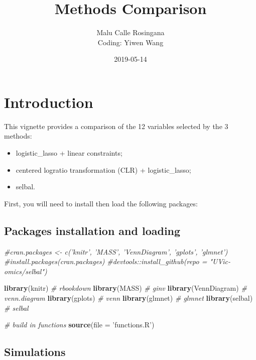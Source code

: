 \documentclass[]{book}
\title{Methods Comparison}
\author{Malu Calle Rosingana\\
Coding: Yiwen Wang}
\date{2019-05-14}
\newenvironment{Shaded}{\begin{snugshade}}{\end{snugshade}}
\newcommand{\KeywordTok}[1]{\textcolor[rgb]{0.13,0.29,0.53}{\textbf{#1}}}
\newcommand{\DataTypeTok}[1]{\textcolor[rgb]{0.13,0.29,0.53}{#1}}
\newcommand{\StringTok}[1]{\textcolor[rgb]{0.31,0.60,0.02}{#1}}
\newcommand{\CommentTok}[1]{\textcolor[rgb]{0.56,0.35,0.01}{\textit{#1}}}
\newcommand{\NormalTok}[1]{#1}
\providecommand{\tightlist}{%
  \setlength{\itemsep}{0pt}\setlength{\parskip}{0pt}}
\begin{document}
\maketitle

{
\setcounter{tocdepth}{3}
\tableofcontents
}
\chapter{Introduction}\label{introduction}

This vignette provides a comparison of the 12 variables selected by the
3 methods:

\begin{itemize}
\tightlist
\item
  logistic\_lasso + linear constraints;
\item
  centered logratio transformation (CLR) + logistic\_lasso;
\item
  selbal.
\end{itemize}

First, you will need to install then load the following packages:

\section{Packages installation and
loading}\label{packages-installation-and-loading}

\begin{Shaded}
\begin{Highlighting}[]
\CommentTok{#cran.packages <- c('knitr', 'MASS', 'VennDiagram', 'gplots', 'glmnet')}
\CommentTok{#install.packages(cran.packages)}
\CommentTok{#devtools::install_github(repo = "UVic-omics/selbal")}

\KeywordTok{library}\NormalTok{(knitr) }\CommentTok{# rbookdown}
\KeywordTok{library}\NormalTok{(MASS) }\CommentTok{# ginv}
\KeywordTok{library}\NormalTok{(VennDiagram) }\CommentTok{# venn.diagram}
\KeywordTok{library}\NormalTok{(gplots) }\CommentTok{# venn}
\KeywordTok{library}\NormalTok{(glmnet) }\CommentTok{# glmnet}
\KeywordTok{library}\NormalTok{(selbal) }\CommentTok{# selbal}

\CommentTok{# build in functions}
\KeywordTok{source}\NormalTok{(}\DataTypeTok{file =} \StringTok{'functions.R'}\NormalTok{)}
\end{Highlighting}
\end{Shaded}

\section{Simulations}\label{simulations}
\end{document}
